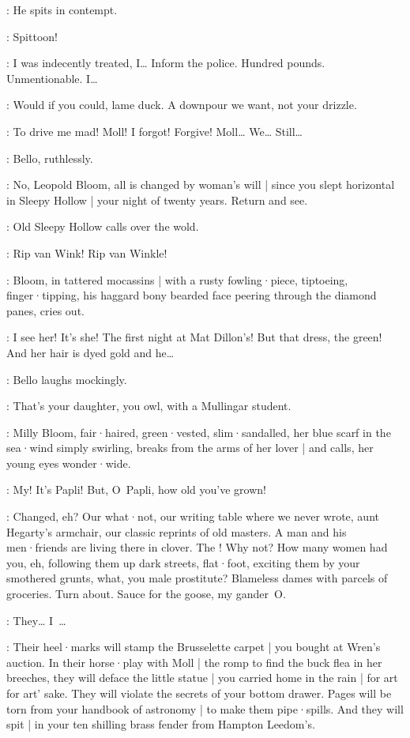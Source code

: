 :
He spits in contempt.

\Bello:
Spittoon!

\Bloom:
I was indecently treated,
I…
Inform the police.
Hundred pounds.
Unmentionable.
I…

\Bello:
Would if you could,
lame duck.
A downpour we want,
not your drizzle.

\Bloom:
To drive me mad!
Moll!
I forgot!
Forgive!
Moll…
We…
Still…

:
Bello,
ruthlessly.

\Bello:
No,
Leopold Bloom,
all is changed by woman's will |
since you slept horizontal in Sleepy Hollow |
your night of twenty years.
Return and see.

:
Old Sleepy Hollow calls over the wold.

\SleepyHollow:
Rip van Wink!
Rip van Winkle!

:
Bloom,
in tattered mocassins |
with a rusty fowling·piece,
%
tiptoeing,
finger·tipping,
his haggard bony bearded face peering through the diamond panes,
cries out.

\Bloom:
I see her!
It's she!
The first night at Mat Dillon's!
But that dress,
the green!
And her hair is dyed gold and he…

:
Bello laughs mockingly.

\Bello:
That's your daughter,
you owl,
with a Mullingar student.

:
Milly Bloom,
fair·haired,
green·vested,
slim·sandalled,
her blue scarf in the sea·wind simply swirling,
breaks from the arms of her lover |
and calls,
her young eyes wonder·wide.

\Milly:
My!
It's Papli!
But,
O~Papli,
how old you've grown!

\Bello:
Changed,
eh?
Our what·not,
our writing table where we never wrote,
aunt Hegarty's armchair,
our classic reprints of old masters.
A man and his men·friends are living there in clover.
The !
Why not?
How many women had you,
eh,
following them up dark streets,
flat·foot,
exciting them by your smothered grunts,
what,
you male prostitute?
Blameless dames with parcels of groceries.
Turn about.
Sauce for the goose,
my gander~O\@.

\Bloom:
They… I~…

\Bello:
Their heel·marks will stamp the Brusselette carpet |
you bought at Wren's auction.
In their horse·play with Moll |
the romp to find the buck flea in her breeches,
they will deface the little statue |
you carried home in the rain |
for art for art' sake.
They will violate the secrets of your bottom drawer.
Pages will be torn from your handbook of astronomy |
to make them pipe·spills.
And they will spit |
in your ten shilling brass fender from Hampton Leedom's.

